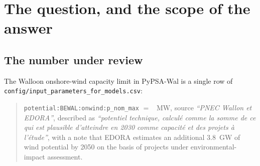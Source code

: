 \documentclass[11pt,a4paper]{article}
\begin{document}
\begin{abstract}
\textbf{The 4--6~km inter-distance is in the 2024 framework, as a
recommendation.} It is recommended between parks, ``peut être réduite selon la
situation paysagère locale'', does not apply along motorways, and is measured
between the nearest masts. \FleetEdgeBelowFour{}\,\% of the standing farms have
a neighbour closer than 4~km. Applied as a hard rule it would bring the gross
reference to \IdFourMW{}~MW (4~km) or \IdSixMW{}~MW (6~km); it is therefore
reported as a sensitivity, not built into the reference.

\textbf{BREGILAB's \BregTotalGW{}~GW is a land-and-wake bound, and it cannot be
reproduced from its own documentation.} Its allocation packs machines on
isolated pixels and applies neither the park nor the landscape rules of the
Cadre; on this study's land those two rules alone divide the land-and-wake bound
by \FreeOverRef{}. Its documented constraint set, applied to open Walloon
data, gives \BregEmuGW{}~GW; its published figure is \BregReportedShare{}\,\% of
that. That its headline sits close to this study's land-and-wake bound is a
coincidence of a looser documented rule set and a tighter undocumented one.

\textbf{PyPSA-Eur's default land analysis is not usable here.} It returns
\BasePnom{}~MW for the Walloon Region, because it admits broad-leaved forest,
ignores the plan de secteur entirely and cannot see scattered housing.
\end{abstract}

\tableofcontents
\newpage

\section{The question, and the scope of the answer}

\subsection{The number under review}

The Walloon onshore-wind capacity limit in PyPSA-Wal is a single row of
\texttt{config/input\_parameters\_for\_models.csv}:

\begin{quote}\small
\texttt{potential:BEWAL:onwind:p\_nom\_max} $=$ \CapToday{}~MW, source
\emph{``PNEC Wallon et EDORA''}, described as \emph{``potentiel technique,
calculé comme la somme de ce qui est plausible d'atteindre en 2030 comme
capacité et des projets à l'étude''}, with a note that EDORA estimates an
additional 3.8~GW of wind potential by 2050 on the basis of projects under
environmental-impact assessment.
\end{quote}
\end{document}
